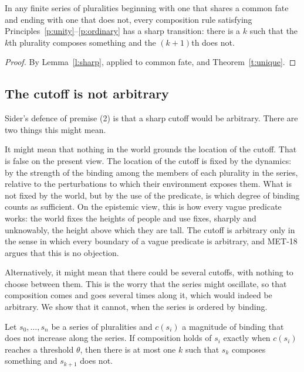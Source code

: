 \documentclass{situationist-preprint}
\begin{document}
\begin{corollary}\label{c:sharpcomp}
In any finite series of pluralities beginning with one that shares a common fate and ending with one that does not, every composition rule satisfying Principles~\ref{p:unity}--\ref{p:ordinary} has a sharp transition: there is a $k$ such that the $k$th plurality composes something and the $(k{+}1)$th does not.
\end{corollary}

\begin{proof}
By Lemma~\ref{l:sharp}, applied to common fate, and Theorem~\ref{t:unique}.
\end{proof}

\subsection{The cutoff is not arbitrary}

Sider's defence of premise (2) is that a sharp cutoff would be arbitrary. There are two things this might mean.

It might mean that nothing in the world grounds the location of the cutoff. That is false on the present view. The location of the cutoff is fixed by the dynamics: by the strength of the binding among the members of each plurality in the series, relative to the perturbations to which their environment exposes them. What is not fixed by the world, but by the use of the predicate, is which degree of binding counts as sufficient. On the epistemic view, this is how every vague predicate works: the world fixes the heights of people and use fixes, sharply and unknowably, the height above which they are tall. The cutoff is arbitrary only in the sense in which every boundary of a vague predicate is arbitrary, and MET-18 argues that this is no objection.

Alternatively, it might mean that there could be several cutoffs, with nothing to choose between them. This is the worry that the series might oscillate, so that composition comes and goes several times along it, which would indeed be arbitrary. We show that it cannot, when the series is ordered by binding.

\begin{proposition}\label{p:unique}
Let $s_0, \dots, s_n$ be a series of pluralities and $c(s_i)$ a magnitude of binding that does not increase along the series. If composition holds of $s_i$ exactly when $c(s_i)$ reaches a threshold $\theta$, then there is at most one $k$ such that $s_k$ composes something and $s_{k+1}$ does not.
\end{proposition}
\end{document}
